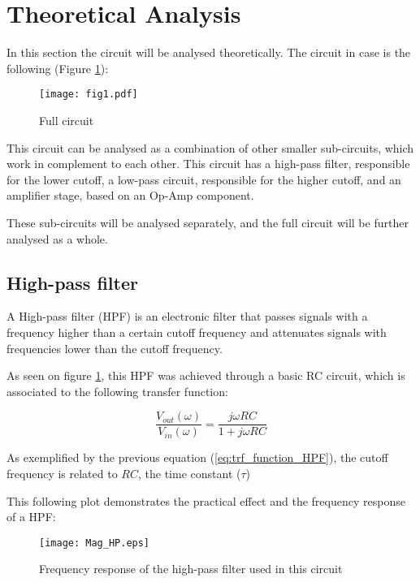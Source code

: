 \section{Theoretical Analysis}
\label{sec:analysis}
\indent

In this section the circuit will be analysed theoretically. The circuit in case is the following (Figure \ref{fig:Circuit}):

\begin{figure}[H]
    \centering
    \texttt{[image: fig1.pdf]}
    \caption{Full circuit}
    \label{fig:Circuit}
\end{figure}

This circuit can be analysed as a combination of other smaller sub-circuits, which work in complement to each other. This circuit has a high-pass filter, responsible for the lower cutoff, a low-pass circuit, responsible for the higher cutoff, and an amplifier stage, based on an Op-Amp component.

These sub-circuits will be analysed separately, and the full circuit will be further analysed as a whole. 

\subsection{High-pass filter}

\indent

A High-pass filter (HPF) is an electronic filter that passes signals with a frequency higher than a certain cutoff frequency and attenuates signals with frequencies lower than the cutoff frequency.

As seen on figure \ref{fig:Circuit}, this HPF was achieved through a basic RC circuit, which is associated to the following transfer function:

\begin{equation}
    \frac{V_{out}(\omega)}{V_{in}(\omega)} = \frac{j\omega RC}{1+j\omega RC}
    \label{eq:trf_function_HPF}
\end{equation}

As exemplified by the previous equation (\ref{eq:trf_function_HPF}), the cutoff frequency is related to $RC$, the time constant ($\tau$)

This following plot demonstrates the practical effect and the frequency response of a HPF:

\begin{figure}[H]
    \centering
    \texttt{[image: Mag\_HP.eps]}
    \caption{Frequency response of the high-pass filter used in this circuit}
    \label{fig:freq_response_HPF}
\end{figure}

